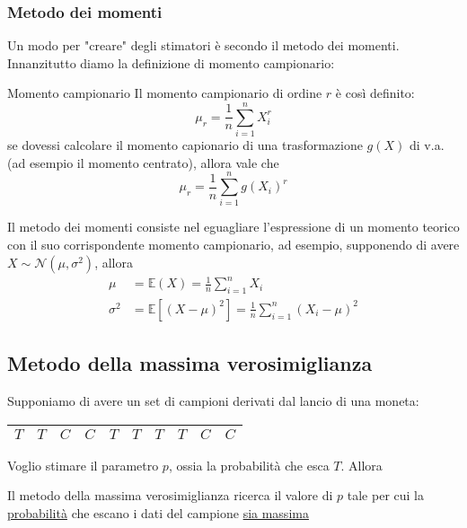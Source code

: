 \subsubsection*{Metodo dei momenti}
Un modo per "creare" degli stimatori è secondo il metodo dei momenti. Innanzitutto diamo la definizione di momento campionario:
\begin{definizione}{Momento campionario}
	Il momento campionario di ordine $ r $ è così definito:
	\[
		\mu _r = \frac{1}{n}\sum_{i=1}^{n} X_i^{r}
	\]
	se dovessi calcolare il momento capionario di una trasformazione $ g\left(X\right) $ di v.a. (ad esempio il momento centrato), allora vale che
	\[
		\mu _r = \frac{1}{n} \sum_{i=1}^{n} g\left(X_i\right)^{r}
	\]
\end{definizione}
Il metodo dei momenti consiste nel eguagliare l'espressione di un momento teorico con il suo corrispondente momento campionario, ad esempio, supponendo di avere $ X \sim \mathcal{N}\left(\mu , \sigma ^2 \right) $, allora
\begin{align*}
	\mu       & = \mathbb{E} \left(X\right) = \frac{1}{n} \sum_{i = 1}^{n} X_{i}                                            \\
	\sigma ^2 & = \mathbb{E} \left[\left(X - \mu \right)^2  \right]  = \frac{1}{n} \sum_{i=1}^{n} \left(X_i - \mu \right)^2
\end{align*}
\subsection{Metodo della massima verosimiglianza}
Supponiamo di avere un set di campioni derivati dal lancio di una moneta:
\begin{center}
	\begin{tabular}{cccccccccc}
		\toprule
		$T$ & $ T$ & $C $ & $C $ & $T $ & $T $ & $T $ & $ T$ & $ C$ & $ C$ \\
		\bottomrule
	\end{tabular}
\end{center}
Voglio stimare il parametro $ p $, ossia la probabilità che esca $ T $. Allora
\begin{tcolorbox}
	Il metodo della massima verosimiglianza ricerca il valore di $ p $ tale per cui la \underline{probabilità} che escano i dati del campione \underline{sia massima}
\end{tcolorbox}

